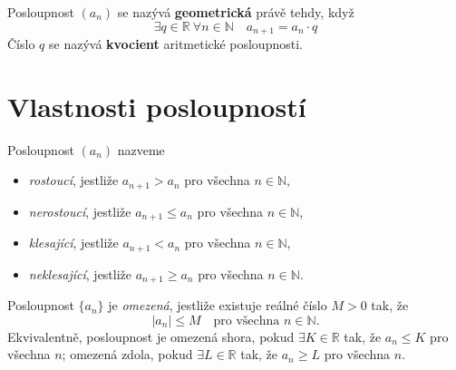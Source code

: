 \documentclass[openany,12pt,a4paper]{book}
\begin{document}
\begin{center}
\end{center}

\begin{definition}
	Posloupnost $(a_n)$ se nazývá \textbf{geometrická} právě tehdy, když
	\[
	\exists q \in \mathbb{R} \ \forall n \in \mathbb{N} \quad a_{n+1} = a_n \cdot q
	\]
	Číslo $q$ se nazývá \textbf{kvocient} aritmetické posloupnosti.
\end{definition}
		
\section{Vlastnosti posloupností}
\begin{definition}
Posloupnost $(a_n)$ nazveme
\begin{itemize}
  \item \emph{rostoucí}, jestliže $a_{n+1} > a_n$ pro všechna $n \in \mathbb{N}$,
  \item \emph{nerostoucí}, jestliže $a_{n+1} \leq a_n$ pro všechna $n \in \mathbb{N}$,
  \item \emph{klesající}, jestliže $a_{n+1} < a_n$ pro všechna $n \in \mathbb{N}$,
  \item \emph{neklesající}, jestliže $a_{n+1} \geq a_n$ pro všechna $n \in \mathbb{N}$.
\end{itemize}
\end{definition}

\begin{definition}
Posloupnost $\{a_n\}$ je \emph{omezená}, jestliže existuje reálné číslo $M > 0$ tak, že
\[
  |a_n| \leq M \quad \text{pro všechna } n \in \mathbb{N}.
\]
Ekvivalentně, posloupnost je omezená shora, pokud $\exists K \in \mathbb{R}$ tak, že $a_n \leq K$ pro všechna $n$;  
omezená zdola, pokud $\exists L \in \mathbb{R}$ tak, že $a_n \geq L$ pro všechna $n$.
\end{definition}
\end{document}
